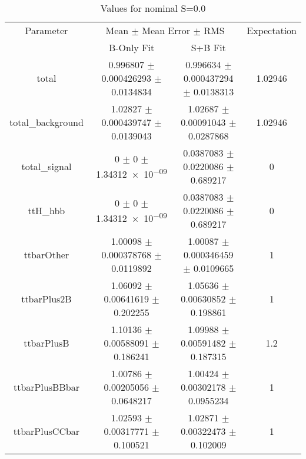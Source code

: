 \begin{table}
\centering
\caption{Values for nominal S=0.0}
\begin{tabular}{cccc}
\toprule
Parameter & \multicolumn{2}{c}{Mean $\pm$ Mean Error $\pm$ RMS} & Expectation\\
 & B-Only Fit & S+B Fit & \\
\midrule
total & \num{0.996807} $\pm$ \num{0.000426293} $\pm$ \num{0.0134834} & \num{0.996634} $\pm$ \num{0.000437294} $\pm$ \num{0.0138313} & \num{1.02946}\\
total\_background & \num{1.02827} $\pm$ \num{0.000439747} $\pm$ \num{0.0139043} & \num{1.02687} $\pm$ \num{0.00091043} $\pm$ \num{0.0287868} & \num{1.02946}\\
total\_signal & \num{0} $\pm$ \num{0} $\pm$ \num{1.34312e-09} & \num{0.0387083} $\pm$ \num{0.0220086} $\pm$ \num{0.689217} & \num{0}\\
ttH\_hbb & \num{0} $\pm$ \num{0} $\pm$ \num{1.34312e-09} & \num{0.0387083} $\pm$ \num{0.0220086} $\pm$ \num{0.689217} & \num{0}\\
ttbarOther & \num{1.00098} $\pm$ \num{0.000378768} $\pm$ \num{0.0119892} & \num{1.00087} $\pm$ \num{0.000346459} $\pm$ \num{0.0109665} & \num{1}\\
ttbarPlus2B & \num{1.06092} $\pm$ \num{0.00641619} $\pm$ \num{0.202255} & \num{1.05636} $\pm$ \num{0.00630852} $\pm$ \num{0.198861} & \num{1}\\
ttbarPlusB & \num{1.10136} $\pm$ \num{0.00588091} $\pm$ \num{0.186241} & \num{1.09988} $\pm$ \num{0.00591482} $\pm$ \num{0.187315} & \num{1.2}\\
ttbarPlusBBbar & \num{1.00786} $\pm$ \num{0.00205056} $\pm$ \num{0.0648217} & \num{1.00424} $\pm$ \num{0.00302178} $\pm$ \num{0.0955234} & \num{1}\\
ttbarPlusCCbar & \num{1.02593} $\pm$ \num{0.00317771} $\pm$ \num{0.100521} & \num{1.02871} $\pm$ \num{0.00322473} $\pm$ \num{0.102009} & \num{1}\\
\bottomrule
\end{tabular}
\end{table}
